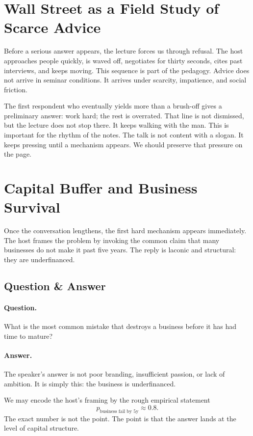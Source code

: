 \section{Wall Street as a Field Study of Scarce Advice}

Before a serious answer appears, the lecture forces us through refusal. The host approaches people quickly, is waved off, negotiates for thirty seconds, cites past interviews, and keeps moving. This sequence is part of the pedagogy. Advice does not arrive in seminar conditions. It arrives under scarcity, impatience, and social friction.

The first respondent who eventually yields more than a brush-off gives a preliminary answer: work hard; the rest is overrated. That line is not dismissed, but the lecture does not stop there. It keeps walking with the man. This is important for the rhythm of the notes. The talk is not content with a slogan. It keeps pressing until a mechanism appears. We should preserve that pressure on the page.

\section{Capital Buffer and Business Survival}

Once the conversation lengthens, the first hard mechanism appears immediately. The host frames the problem by invoking the common claim that many businesses do not make it past five years. The reply is laconic and structural: they are underfinanced.

\subsection{Question \& Answer}

\paragraph{Question.} What is the most common mistake that destroys a business before it has had time to mature?

\paragraph{Answer.} The speaker's answer is not poor branding, insufficient passion, or lack of ambition. It is simply this: the business is underfinanced.

We may encode the host's framing by the rough empirical statement
\begin{equation}
p_{\text{business fail by 5y}} \approx 0.8.
\end{equation}
The exact number is not the point. The point is that the answer lands at the level of capital structure.

